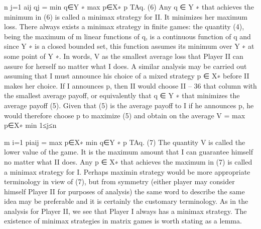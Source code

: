 \documentclass[]{report}
\begin{document}
n
j=1
aij qj = min
q∈Y ∗ max
p∈X∗ p
TAq. (6)
Any q ∈ Y ∗ that achieves the minimum in (6) is called a minimax strategy for II. It
minimizes her maximum loss. There always exists a minimax strategy in finite games: the
quantity (4), being the maximum of m linear functions of q, is a continuous function of q
and since Y ∗ is a closed bounded set, this function assumes its minimum over Y ∗ at some
point of Y ∗.
In words, V as the smallest average loss that Player II can assure for herself no matter
what I does.
A similar analysis may be carried out assuming that I must announce his choice of a
mixed strategy p ∈ X∗ before II makes her choice. If I announces p, then II would choose
II – 36
that column with the smallest average payoff, or equivalently that q ∈ Y ∗ that minimizes
the average payoff (5). Given that (5) is the average payoff to I if he announces p, he
would therefore choose p to maximize (5) and obtain on the average
V = max
p∈X∗ min
1≤j≤n

m
i=1
piaij = max
p∈X∗ min
q∈Y ∗ p
TAq. (7)
The quantity V is called the lower value of the game. It is the maximum amount that I can
guarantee himself no matter what II does. Any p ∈ X∗ that achieves the maximum in (7)
is called a minimax strategy for I. Perhaps maximin strategy would be more appropriate
terminology in view of (7), but from symmetry (either player may consider himself Player
II for purposes of analysis) the same word to describe the same idea may be preferable
and it is certainly the customary terminology. As in the analysis for Player II, we see that
Player I always has a minimax strategy. The existence of minimax strategies in matrix
games is worth stating as a lemma.
\end{document}
